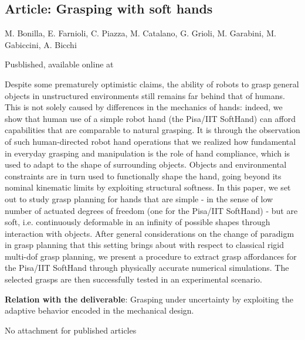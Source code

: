 \documentclass[a4paper,11pt,pdf]{pacmanreport}
\begin{document}
\subsection{Article: Grasping with soft hands} \label{ann:softGrasps}
\begin{description}
    \item[Authors] M. Bonilla, E. Farnioli, C. Piazza, M. Catalano, G. Grioli, M. Garabini, M. Gabiccini, A. Bicchi
    \item[Info] Pusblished, available online at 
    \item[Abstract] Despite some prematurely optimistic claims, the ability of robots to grasp general objects in unstructured environments still remains far behind that of humans. This is not solely caused by differences in the mechanics of hands: indeed, we show that human use of a simple robot hand (the Pisa/IIT SoftHand) can afford capabilities that are comparable to natural grasping. It is through the observation of such human-directed robot hand operations that we realized how fundamental in everyday grasping and manipulation is the role of hand compliance, which is used to adapt to the shape of surrounding objects. Objects and environmental constraints are in turn used to functionally shape the hand, going beyond its nominal kinematic limits by exploiting structural softness. In this paper, we set out to study grasp planning for hands that are simple - in the sense of low number of actuated degrees of freedom (one for the Pisa/IIT SoftHand) - but are soft, i.e. continuously deformable in an infinity of possible shapes through interaction with objects. After general considerations on the change of paradigm in grasp planning that this setting brings about with respect to classical rigid multi-dof grasp planning, we present a procedure to extract grasp affordances for the Pisa/IIT SoftHand through physically accurate numerical simulations. The selected grasps are then successfully tested in an experimental scenario.
    \item \textbf{Relation with the deliverable}: Grasping under uncertainty by exploiting the adaptive behavior encoded in the mechanical design.
    \item[Attachment] No attachment for published articles
\end{description}
\end{document}
